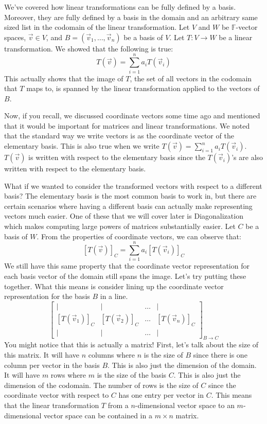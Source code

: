 We’ve covered how linear transformations can be fully defined by a basis. Moreover, they are
fully defined by a basis in the domain and an arbitrary same sized list in the codomain of the linear
transformation. Let $V$ and $W$ be $\mathbb{F}$-vector spaces, $\vec{v}\in V$, and $B=(\vec{v}_1,\ldots,\vec{v}_n)$ be a basis of $V$. Let $T:V\to W$ be a linear transformation. We showed that the following is true:
$$T(\vec{v})=\sum_{i=1}^n a_iT(\vec{v}_i)$$
This actually shows that the image of $T$, the set of all vectors in the codomain that $T$ maps to, is spanned by the linear transformation applied to the vectors of $B$.

Now, if you recall, we discussed coordinate vectors some time ago and mentioned that it would be important for matrices and linear transformations. We noted that the standard way we write vectors is as the coordinate vector of the elementary basis. This is also true when we write $T(\vec{v})=\sum_{i=1}^n a_iT(\vec{v}_i)$. $T(\vec{v})$ is written with respect to the elementary basis since the $T(\vec{v}_i)$'s are also written with respect to the elementary basis. 

What if we wanted to consider the transformed vectors with respect to a different basis? The elementary basis is the most common basis to work in, but there are certain scenarios where having a different basis can actually make representing vectors much easier. One of these that we will cover later is Diagonalization which makes computing large powers of matrices substantially easier. Let $C$ be a basis of $W$. From the properties of coordinate vectors, we can observe that:
$$[T(\vec{v})]_C=\sum_{i=1}^n a_i[T(\vec{v}_i)]_C$$
We still have this same property that the coordinate vector representation for each basis vector of the domain still spans the image. Let's try putting these together. What this means is consider lining up the coordinate vector representation for the basis $B$ in a line.
$$\begin{bmatrix}
    \vert & \vert & \ldots & \vert \\
    [T(\vec{v}_1)]_C & [T(\vec{v}_2)]_C & \ldots & [T(\vec{v}_n)]_C \\
    \vert & \vert & \ldots & \vert
\end{bmatrix}_{B\to C}$$
You might notice that this is actually a matrix! First, let's talk about the size of this matrix. It will have $n$ columns where $n$ is the size of $B$ since there is one column per vector in the basis $B$. This is also just the dimension of the domain. It will have $m$ rows where $m$ is the size of the basis $C$. This is also just the dimension of the codomain. The number of rows is the size of $C$ since the coordinate vector with respect to $C$ has one entry per vector in $C$. This means that the linear transformation $T$ from a $n$-dimensional vector space to an $m$-dimensional vector space can be contained in a $m\times n$ matrix.

